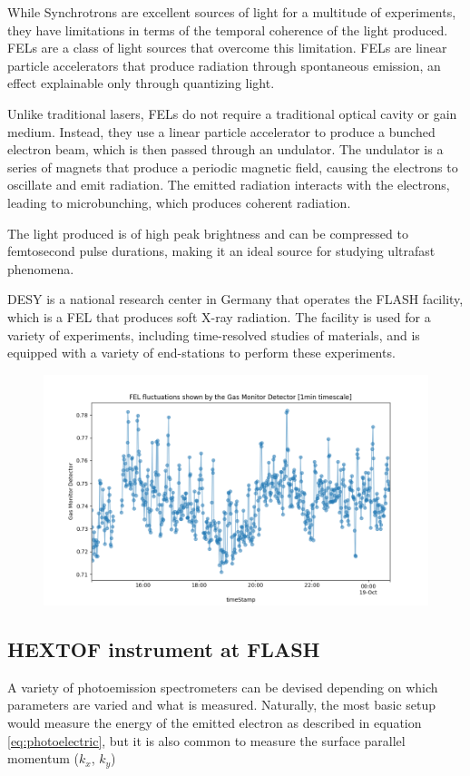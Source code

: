 While Synchrotrons are excellent sources of light for a multitude of experiments, they have limitations in terms of the temporal coherence of the light produced. \glspl{FEL} are a class of light sources that overcome this limitation. \glspl{FEL} are linear particle accelerators that produce radiation through spontaneous emission, an effect explainable only through quantizing light. 

Unlike traditional lasers, FELs do not require a traditional optical cavity or gain medium. Instead, they use a linear particle accelerator to produce a bunched electron beam, which is then passed through an undulator. The undulator is a series of magnets that produce a periodic magnetic field, causing the electrons to oscillate and emit radiation. The emitted radiation interacts with the electrons, leading to microbunching, which produces coherent radiation.

The light produced is of high peak brightness and can be compressed to femtosecond pulse durations, making it an ideal source for studying ultrafast phenomena.

\gls{DESY} is a national research center in Germany that operates the \gls{FLASH} facility, which is a \gls{FEL} that produces soft X-ray radiation. The facility is used for a variety of experiments, including time-resolved studies of materials, and is equipped with a variety of end-stations to perform these experiments.


\begin{figure}
    \includegraphics[width=1\linewidth]{images/2024-08-16-13-56-32.png}
\end{figure}


\subsection{HEXTOF instrument at FLASH}
A variety of photoemission spectrometers can be devised depending on which parameters are varied and what is measured. Naturally, the most basic setup would measure the energy of the emitted electron as described in equation \ref{eq:photoelectric}, but it is also common to measure the surface parallel momentum ($k_x$, $k_y$)

